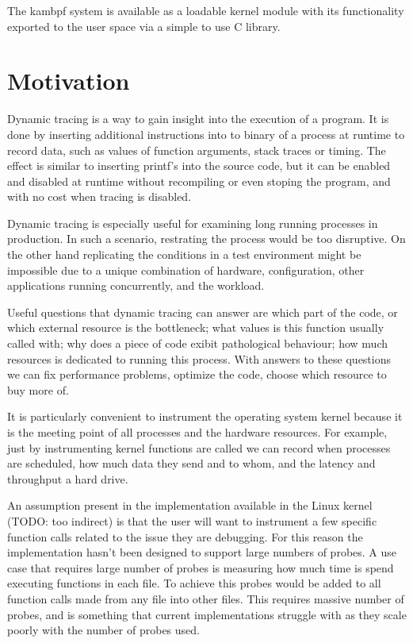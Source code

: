 \documentclass[12pt,twoside,notitlepage]{report}
\begin{document}
    The kambpf system is available as a loadable kernel module with its functionality exported to the user space via a simple to use C library.

    \section{Motivation}

        Dynamic tracing is a way to gain insight into the execution of a program. It is done by inserting additional instructions into to binary of a process at runtime to record data, such as values of function arguments, stack traces or timing. The effect is similar to inserting printf's into the source code, but it can be enabled and disabled at runtime without recompiling or even stoping the program, and with no cost when tracing is disabled.

        Dynamic tracing is especially useful for examining long running processes in production. In such a scenario, restrating the process would be too disruptive. On the other hand replicating the conditions in a test environment might be impossible due to a unique combination of hardware, configuration, other applications running concurrently, and the workload. 

        Useful questions that dynamic tracing can answer are which part of the code, or which external resource is the bottleneck; what values is this function usually called with; why does a piece of code exibit pathological behaviour; how much resources is dedicated to running this process. With answers to these questions we can fix performance problems, optimize the code, choose which resource to buy more of.

        It is particularly convenient to instrument the operating system kernel because it is the meeting point of all processes and the hardware resources. For example, just by instrumenting kernel functions are called we can record when processes are scheduled, how much data they send and to whom, and the latency and throughput a hard drive.

        An assumption present in the implementation available in the Linux kernel (TODO: too indirect) is that the user will want to instrument a few specific function calls related to the issue they are debugging. For this reason the implementation hasn't been designed to support large numbers of probes. A use case that requires large number of probes is measuring how much time is spend executing functions in each file. To achieve this probes would be added to all function calls made from any file into other files. This requires massive number of probes, and is something that current implementations struggle with as they scale poorly with the number of probes used.
\end{document}
